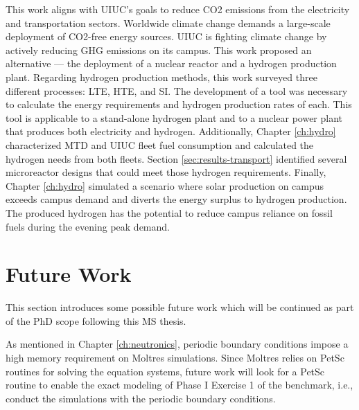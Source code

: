 This work aligns with UIUC's goals to reduce \gls{CO2} emissions from the electricity and transportation sectors.
Worldwide climate change demands a large-scale deployment of \gls{CO2}-free energy sources.
UIUC is fighting climate change by actively reducing GHG emissions on its campus.
This work proposed an alternative --- the deployment of a nuclear reactor and a hydrogen production plant.
Regarding hydrogen production methods, this work surveyed three different processes: LTE, HTE, and SI.
The development of a tool was necessary to calculate the energy requirements and hydrogen production rates of each.
This tool is applicable to a stand-alone hydrogen plant and to a nuclear power plant that produces both electricity and hydrogen.
Additionally, Chapter \ref{ch:hydro} characterized MTD and UIUC fleet fuel consumption and calculated the hydrogen needs from both fleets.
Section \ref{sec:results-transport} identified several microreactor designs that could meet those hydrogen requirements.
Finally, Chapter \ref{ch:hydro} simulated a scenario where solar production on campus exceeds campus demand and diverts the energy surplus to hydrogen production.
The produced hydrogen has the potential to reduce campus reliance on fossil fuels during the evening peak demand.

\section{Future Work}
\label{sec:futwork}

This section introduces some possible future work which will be continued as part of the PhD scope following this MS thesis.

As mentioned in Chapter \ref{ch:neutronics}, periodic boundary conditions impose a high memory requirement on Moltres simulations.
Since Moltres relies on PetSc routines for solving the equation systems, future work will look for a PetSc routine to enable the exact modeling of Phase I Exercise 1 of the benchmark, i.e., conduct the simulations with the periodic boundary conditions.

